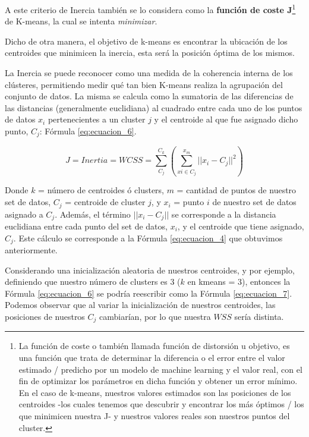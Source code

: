 \documentclass[12pt,a4paper]{article}
\begin{document}
\begin{sloppypar}
A este criterio de Inercia también se lo considera como la \textbf{función de coste J}\footnote{La función de coste o también llamada función de distorsión u objetivo, es una función que trata de determinar la diferencia o el error entre el valor estimado / predicho por un modelo de machine learning y el valor real, con el fin de optimizar los parámetros en dicha función y obtener un error mínimo. En el caso de k-means, nuestros valores estimados son las posiciones de los centroides -los cuales tenemos que descubrir y encontrar los más óptimos / los que minimicen nuestra J- y nuestros valores reales son nuestros puntos del cluster.} de K-means, la cual se intenta \textit{minimizar}. 

Dicho de otra manera, el objetivo de k-means es encontrar la ubicación de los centroides que minimicen la inercia, esta será la posición óptima de los mismos.

La Inercia\cite{K_means_experiment} se puede reconocer como una medida de la coherencia interna de los clústeres, permitiendo medir qué tan bien K-means realiza la agrupación del conjunto de datos. La misma se calcula como la sumatoria de las diferencias de las distancias (generalmente euclidiana) al cuadrado entre cada uno de los puntos de datos $x_{i}$ pertenecientes a un cluster $j$ y el centroide al que fue asignado dicho punto, $C_{j}$: Fórmula \ref{eq:ecuacion_6}.

\begin{equation}\label{eq:ecuacion_6}
J = Inertia = WCSS = \sum_{C_{j}}^{C_{k}}  ( \sum_{xi \in C_{j}}^{x_{m}}||x_{i}-C_{j}||^2)
\end{equation}

Donde $k$ = número de centroides ó clusters, $m$ = cantidad de puntos de nuestro set de datos, $C_{j}$ = centroide de cluster $j$, y $x_{i}$ = punto $i$ de nuestro set de datos asignado a $C_{j}$. Además, el término $||x_{i}-C_{j}||$ se corresponde a la distancia euclidiana entre cada punto del set de datos, $x_{i}$, y el centroide que tiene asignado, $C_{j}$. Este cálculo se corresponde a la Fórmula \ref{eq:ecuacion_4} que obtuvimos anteriormente.

Considerando una inicialización aleatoria de nuestros centroides, y por ejemplo, definiendo que nuestro número de clusters es 3 ($k$ en kmeans = 3), entonces la Fórmula \ref{eq:ecuacion_6} se podría reescribir como la Fórmula \ref{eq:ecuacion_7}. Podemos observar que al variar la inicialización de nuestros centroides, las posiciones de nuestros $C_{j}$ cambiarían, por lo que nuestra $WSS$ sería distinta. 


\end{sloppypar}
\end{document}

